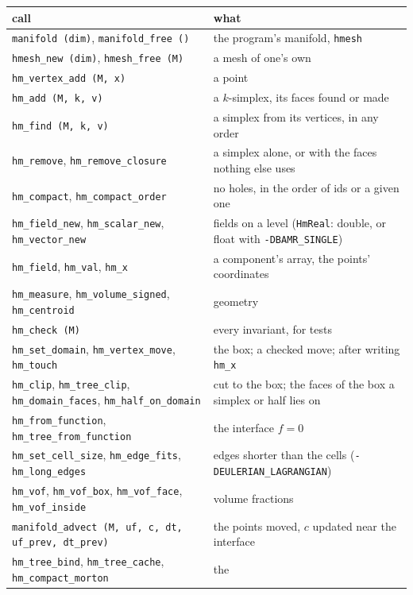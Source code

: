 \documentclass[10pt,a4paper]{article}
\theoremstyle{definition}
\newcommand{\fn}[1]{\texttt{#1}}
\begin{document}
\begin{center}
\small
\begin{tabularx}{\textwidth}{@{}>{\raggedright}p{}X@{}}
  \toprule
  call & what \\
  \midrule
  \fn{manifold (dim)}, \fn{manifold\_free ()} & the program's manifold,
    \fn{hmesh} \\
  \fn{hmesh\_new (dim)}, \fn{hmesh\_free (M)} & a mesh of one's own \\
  \fn{hm\_vertex\_add (M, x)} & a point \\
  \fn{hm\_add (M, k, v)} & a $k$-simplex, its faces found or made \\
  \fn{hm\_find (M, k, v)} & a simplex from its vertices, in any order \\
  \fn{hm\_remove}, \fn{hm\_remove\_closure} & a simplex alone, or with the
    faces nothing else uses \\
  \fn{hm\_compact}, \fn{hm\_compact\_order} & no holes, in the order of ids
    or a given one \\
  \fn{hm\_field\_new}, \fn{hm\_scalar\_new}, \fn{hm\_vector\_new} & fields on
    a level (\fn{HmReal}: double, or float with \fn{-DBAMR\_SINGLE}) \\
  \fn{hm\_field}, \fn{hm\_val}, \fn{hm\_x} & a component's array, the
    points' coordinates \\
  \fn{hm\_measure}, \fn{hm\_volume\_signed}, \fn{hm\_centroid} & geometry \\
  \fn{hm\_check (M)} & every invariant, for tests \\
  \fn{hm\_set\_domain}, \fn{hm\_vertex\_move}, \fn{hm\_touch} & the box; a
    checked move; after writing \fn{hm\_x} \\
  \fn{hm\_clip}, \fn{hm\_tree\_clip}, \fn{hm\_domain\_faces},
    \fn{hm\_half\_on\_domain} & cut to the box; the faces of the box a
    simplex or half lies on \\
  \fn{hm\_from\_function}, \fn{hm\_tree\_from\_function} & the interface
    $f = 0$ \\
  \fn{hm\_set\_cell\_size}, \fn{hm\_edge\_fits}, \fn{hm\_long\_edges} & edges
    shorter than the cells (\fn{-DEULERIAN\_LAGRANGIAN}) \\
  \fn{hm\_vof}, \fn{hm\_vof\_box}, \fn{hm\_vof\_face}, \fn{hm\_vof\_inside} &
    volume fractions \\
  \fn{manifold\_advect (M, uf, c, dt, uf\_prev, dt\_prev)} & the points
    moved, $c$ updated near the interface \\
  \fn{hm\_tree\_bind}, \fn{hm\_tree\_cache}, \fn{hm\_compact\_morton} & the

\end{tabularx}
\end{center}
\end{document}
